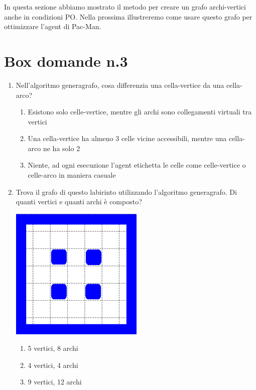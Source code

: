 \documentclass[8pt]{book}
\begin{document}
In questa sezione abbiamo mostrato il metodo per creare un grafo archi-vertici anche in condizioni PO. Nella prossima illustreremo come usare questo grafo per ottimizzare l'agent di Pac-Man.

\newpage
\section*{Box domande n.3}

\begin{enumerate}
\item Nell'algoritmo generagrafo, cosa differenzia una cella-vertice da una cella-arco?

\begin{enumerate}
\def\labelenumi{\alph{enumi}.}

\item
  Esistono solo celle-vertice, mentre gli archi sono collegamenti virtuali tra vertici
\item
  Una cella-vertice ha almeno 3 celle vicine accessibili, mentre una cella-arco ne ha solo 2
\item
  Niente, ad ogni esecuzione l'agent etichetta le celle come celle-vertice o celle-arco in maniera casuale
\end{enumerate}

\item Trova il grafo di questo labirinto utilizzando l'algoritmo generagrafo. Di quanti vertici e quanti archi è composto?

\includegraphics[width=0.50000\textwidth]{img/num_VerticiArchi_es.png}\\[2\baselineskip]

\begin{enumerate}
\def\labelenumi{\alph{enumi}.}

\item
  5 vertici, 8 archi
\item
  4 vertici, 4 archi
\item
  9 vertici, 12 archi
\end{enumerate}


\end{enumerate}
\end{document}
